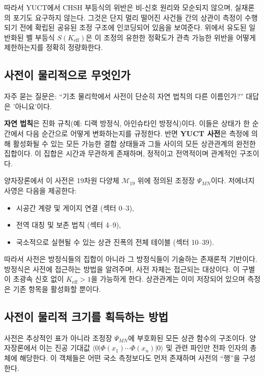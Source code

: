 \documentclass[12pt,a4paper]{article}
\begin{document}
	따라서 YUCT에서 CHSH 부등식의 위반은 비-신호 원리와 모순되지 않으며, 실재론의 포기도 요구하지 않는다. 그것은 단지 멀리 떨어진 사건들 간의 상관이 측정이 수행되기 전에 확립된 공유된 조정 구조에 인코딩되어 있음을 보여준다. 위에서 유도된 일반화된 벨 부등식 $S(K_{\mathrm{eff}})$은 이 조정의 유한한 정확도가 관측 가능한 위반을 어떻게 제한하는지를 정확히 정량화한다.
	
	\subsection*{사전이 물리적으로 무엇인가}
	
	자주 묻는 질문은: ``기초 물리학에서 사전이 단순히 자연 법칙의 다른 이름인가?'' 대답은 '아니요'이다.
	
	\textbf{자연 법칙}은 진화 규칙(예: 디랙 방정식, 아인슈타인 방정식)이다. 이들은 상태가 한 순간에서 다음 순간으로 어떻게 변화하는지를 규정한다. 반면 \textbf{YUCT 사전}은 측정에 의해 활성화될 수 있는 모든 가능한 결합 상태들과 그들 사이의 모든 상관관계의 완전한 집합이다. 이 집합은 시간과 무관하게 존재하며, 정적이고 전역적이며 관계적인 구조이다.
	
	양자장론에서 이 사전은 19차원 다양체 $\mathcal{M}_{19}$ 위에 정의된 조정장 $\Psi_{MN}$이다. 저에너지 사영은 다음을 제공한다:
	\begin{itemize}
		\item 시공간 계량 및 게이지 연결 (섹터 0--3),
		\item 전역 대칭 및 보존 법칙 (섹터 4--9),
		\item 국소적으로 실현될 수 있는 상관 진폭의 전체 테이블 (섹터 10--39).
	\end{itemize}
	따라서 사전은 방정식들의 집합이 아니라 그 방정식들이 기술하는 존재론적 기반이다. 방정식은 사전에 접근하는 방법을 알려주며, 사전 자체는 접근되는 대상이다. 이 구별이 초광속 신호 없이 $K_{\mathrm{eff}} > 1$을 가능하게 한다. 상관관계는 이미 저장되어 있으며 측정은 기존 항목을 활성화할 뿐이다.
	
	\subsection*{사전이 물리적 크기를 획득하는 방법}
	
	사전은 추상적인 표가 아니라 조정장 $\Psi_{MN}$에 부호화된 모든 상관 함수의 구조이다. 양자장론에서 이는 진공 기대값 $\langle 0|\Phi(x_1)\cdots\Phi(x_n)|0\rangle$ 및 관련 파인만 전파 인자의 총체에 해당한다. 이 객체들은 어떤 국소 측정보다도 먼저 존재하며 사전의 ``행''을 구성한다.
	
\end{document}
